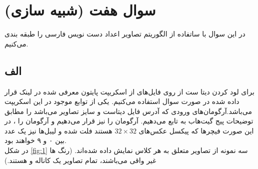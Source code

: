 \documentclass[12pt,onecolumn,a4paper]{article}
\begin{document}
\newpage
\section{سوال هفت (شبیه سازی)}
در این سوال با ساتفاده از الگوریتم  تصاویر اعداد دست نویس فارسی را طبقه بندی می‌کنیم.
\subsection*{الف}
برای لود کردن دیتا ست از روی فایل‌های  از اسکریپت پایتون معرفی شده در لینک قرار داده شده در صورت سوال استفاده می‌کنیم. یکی از توابع موجود در این اسکریپت  می‌باشد.آرگومان‌های ورودی که آدرس فایل دیتاست و سایز تصاویر می‌باشد را مطابق توضیحات پیج گیت‌هاب به تابع می‌دهیم. آرگومان  را نیز  قرار می‌دهیم و آرگومان  را ، در این صورت فیچرها که پیکسل عکس‌های $32\times 32$ هستند فلت شده و لیبل‌ها نیز یک عدد بین ۰ و ۹ خواهند بود.\\
در شکل \ref{fig:1} سه نمونه از تصاویر متعلق به هر کلاس نمایش داده ‌شده‌اند. (رنگ‌ ها غیر واقی می‌باشند، تمام تصاویر یک کاناله و  هستند.)
\end{document}
